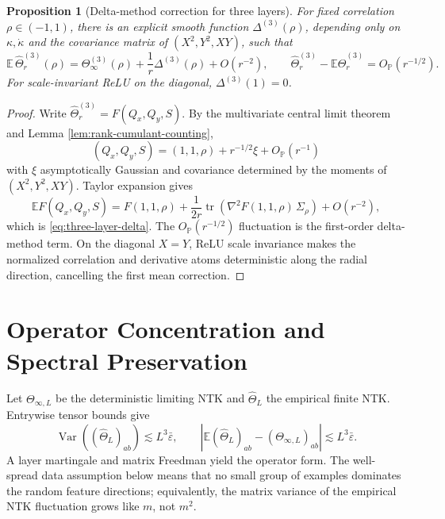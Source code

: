 \documentclass{article}
\newtheorem{proposition}[theorem]{Proposition}
\newcommand{\E}{\mathbb E}
\newcommand{\Pp}{\mathbb P}
\newcommand{\Var}{\operatorname{Var}}
\newcommand{\tr}{\operatorname{tr}}
\newcommand{\wh}{\widehat}
\newcommand{\barE}{\bar\varepsilon}
\begin{document}
\begin{proposition}[Delta-method correction for three layers]
\label{prop:three-layer-delta}
For fixed correlation \(\rho\in(-1,1)\), there is an explicit smooth function \(\Delta^{(3)}(\rho)\), depending only on \(\kappa,\dot\kappa\) and the covariance matrix of \((X^2,Y^2,XY)\), such that
\begin{equation}
\E\,\wh\Theta^{(3)}_r(\rho)
=\Theta^{(3)}_\infty(\rho)+\frac1r\Delta^{(3)}(\rho)+O(r^{-2}),
\qquad
\wh\Theta^{(3)}_r-\E\wh\Theta^{(3)}_r=O_{\Pp}(r^{-1/2}).
\label{eq:three-layer-delta}
\end{equation}
For scale-invariant ReLU on the diagonal, \(\Delta^{(3)}(1)=0\).
\end{proposition}

\begin{proof}
Write \(\wh\Theta^{(3)}_r=F(Q_x,Q_y,S)\). By the multivariate central limit theorem and Lemma \ref{lem:rank-cumulant-counting},
\[
(Q_x,Q_y,S)=(1,1,\rho)+r^{-1/2}\xi+O_{\Pp}(r^{-1})
\]
with \(\xi\) asymptotically Gaussian and covariance determined by the moments of \((X^2,Y^2,XY)\). Taylor expansion gives
\[
\E F(Q_x,Q_y,S)
=F(1,1,\rho)+\frac1{2r}\tr\left(\nabla^2F(1,1,\rho)\,\Sigma_\rho\right)+O(r^{-2}),
\]
which is \eqref{eq:three-layer-delta}. The \(O_{\Pp}(r^{-1/2})\) fluctuation is the first-order delta-method term. On the diagonal \(X=Y\), ReLU scale invariance makes the normalized correlation and derivative atoms deterministic along the radial direction, cancelling the first mean correction.
\end{proof}

\section{Operator Concentration and Spectral Preservation}
Let \(\Theta_{\infty,L}\) be the deterministic limiting NTK and \(\wh\Theta_L\) the empirical finite NTK. Entrywise tensor bounds give
\begin{equation}
\Var((\wh\Theta_L)_{ab})\lesssim L^3\barE,
\qquad
|\E(\wh\Theta_L)_{ab}-(\Theta_{\infty,L})_{ab}|\lesssim L^3\barE.
\end{equation}
A layer martingale and matrix Freedman yield the operator form. The well-spread data assumption below means that no small group of examples dominates the random feature directions; equivalently, the matrix variance of the empirical NTK fluctuation grows like \(m\), not \(m^2\).
\end{document}
